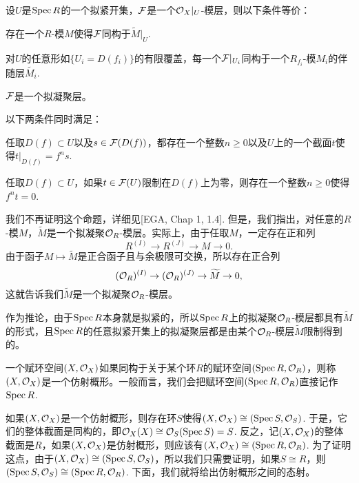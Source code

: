 \begin{pro}[素谱上的拟凝聚层]\label{niningju}
设$U$是$\operatorname{Spec} R$的一个拟紧开集，$\mathcal{F}$是一个$\mathcal{O}_X|_U$-模层，则以下条件等价：
\begin{compactenum}[~~~(1).]
\item 存在一个$R$-模$M$使得$\mathcal{F}$同构于$\widetilde{M}|_U$.
\item 对$U$的任意形如$\{U_i=D(f_i)\}$的有限覆盖，每一个$\mathcal{F}|_{U_i}$同构于一个$R_{f_i}$-模$M_i$的伴随层$\widetilde{M_i}$.
\item $\mathcal{F}$是一个拟凝聚层。
\item 以下两条件同时满足：
\begin{compactenum}[\hspace{-1em}1.]
\item 任取$D(f)\subset U$以及$s\in \mathcal{F}(D(f))$，都存在一个整数$n\geq 0$以及$U$上的一个截面$t$使得$t|_{D(f)}=f^ns$.
\item 任取$D(f)\subset U$，如果$t\in \mathcal{F}(U)$限制在$D(f)$上为零，则存在一个整数$n\geq 0$使得$f^nt=0$.
\end{compactenum}
\end{compactenum}
\end{pro}

我们不再证明这个命题，详细见[EGA, Chap 1, 1.4]. 但是，我们指出，对任意的$R$-模$M$，$\widetilde{M}$是一个拟凝聚$\mathcal{O}_R$-模层。实际上，由于任取$M$，一定存在正和列
\[
	R^{(I)}\to R^{(J)}\to M\to 0.
\]
由于函子$M\mapsto \widetilde{M}$是正合函子且与余极限可交换，所以存在正合列
\[
	(\mathcal{O}_R)^{(I)}\to (\mathcal{O}_R)^{(J)}\to \widetilde{M}\to 0,
\]
这就告诉我们$\widetilde{M}$是一个拟凝聚$\mathcal{O}_R$-模层。

作为推论，由于$\operatorname{Spec} R$本身就是拟紧的，所以$\operatorname{Spec} R$上的拟凝聚$\mathcal{O}_R$-模层都具有$\widetilde{M}$的形式，且$\operatorname{Spec} R$的任意拟紧开集上的拟凝聚层都是由某个$\mathcal{O}_R$-模层$\widetilde{M}$限制得到的。

\begin{para}
一个赋环空间$(X,\mathcal{O}_X)$如果同构于关于某个环$R$的赋环空间$(\operatorname{Spec} R,\mathcal{O}_R)$，则称$(X,\mathcal{O}_X)$是一个仿射概形。一般而言，我们会把赋环空间$(\operatorname{Spec} R,\mathcal{O}_R)$直接记作$\operatorname{Spec} R$.

如果$(X,\mathcal{O}_X)$是一个仿射概形，则存在环$S$使得$(X,\mathcal{O}_X)\cong (\operatorname{Spec} S,\mathcal{O}_S)$. 于是，它们的整体截面是同构的，即$\mathcal{O}_X(X)\cong \mathcal{O}_S(\operatorname{Spec} S)=S$. 反之，记$(X,\mathcal{O}_X)$的整体截面是$R$，如果$(X,\mathcal{O}_X)$是仿射概形，则应该有$(X,\mathcal{O}_X)\cong (\operatorname{Spec} R,\mathcal{O}_R)$. 为了证明这点，由于$(X,\mathcal{O}_X)\cong (\operatorname{Spec} S,\mathcal{O}_S)$，所以我们只需要证明，如果$S\cong R$，则$(\operatorname{Spec} S,\mathcal{O}_S)\cong (\operatorname{Spec} R,\mathcal{O}_R)$. 下面，我们就将给出仿射概形之间的态射。
\end{para}

